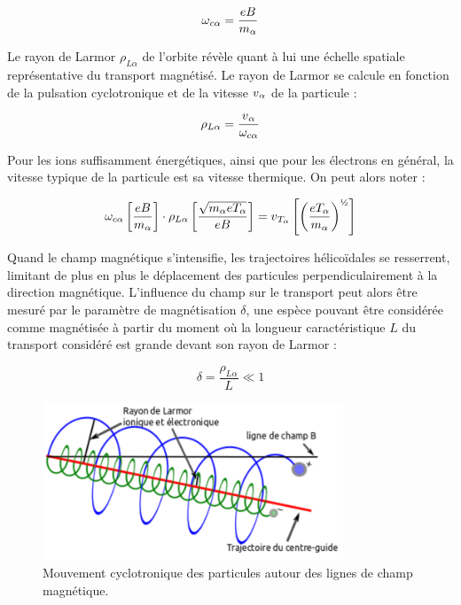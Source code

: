 \begin{refsection}
\begin{equation}
\omega{_{{c\alpha}}}=\frac{e B}{m_\alpha}
\end{equation}

Le rayon de Larmor $\rho_{L\alpha}$ de l'orbite révèle quant à lui une
échelle spatiale représentative du transport magnétisé. Le rayon de Larmor se
calcule en fonction de la pulsation cyclotronique et de la vitesse
$v{_{\alpha}}$ de la particule :

\begin{equation}
\rho_{L \alpha}
=\frac{v{_{\alpha}}}{\omega_{c{\alpha}}}
\end{equation}

Pour les ions suffisamment énergétiques, ainsi que pour les électrons en général,
la vitesse typique de la particule est sa vitesse thermique. On peut alors noter :

\begin{equation}
\omega_{c\alpha}\left[\frac{e B}{m_\alpha}\right]
\cdot\rho_{L\alpha}\left[\frac{\sqrt{m_\alpha eT_\alpha}}{eB}\right]
=v\indice{T_{\alpha}}\left[\left(\frac{eT_{\alpha}}{m_{\alpha}}\right)^{\text{\textonehalf}}\right]
\end{equation}

Quand le champ magnétique s'intensifie, les trajectoires
hélicoïdales se resserrent, limitant de plus en plus le déplacement des
particules perpendiculairement à la direction magnétique. L'influence du champ
sur le transport peut alors être mesuré par le paramètre de
magnétisation $\delta$, une espèce pouvant être considérée comme magnétisée à
partir du moment où la longueur caractéristique $L$ du transport considéré est
grande devant son rayon de Larmor :

\begin{equation}
\delta=\frac{\rho_{L\alpha}}{L}\ll 1
\end{equation}

\begin{figure}[htbp]
\centering
\includegraphics[width=0.8\textwidth]{figures/1-mouvementCyclotron.png}
{\caption{Mouvement cyclotronique des particules autour des lignes de champ
magnétique.}\label{1-particleDrifts}}
\end{figure}


\end{refsection}
